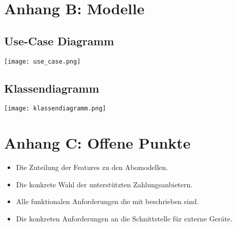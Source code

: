 \section*{Anhang B: Modelle}\label{sec:app_modelle}
\subsection{Use-Case Diagramm}
\texttt{[image: use\_case.png]}

\subsection{Klassendiagramm}
\texttt{[image: klassendiagramm.png]}

\section*{Anhang C: Offene Punkte}

\begin{itemize}
	\item Die Zuteilung der Features zu den Abomodellen.
	\item Die konkrete Wahl der unterstützten Zahlungsanbietern.
	\item Alle funktionalen Anforderungen die mit  beschrieben sind.
	\item Die konkreten Anforderungen an die Schnittstelle für externe Geräte.
\end{itemize}

